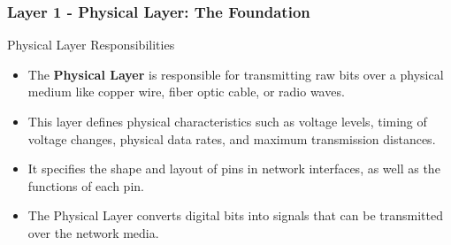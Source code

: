 \documentclass{beamer}
\begin{document}
\begin{frame}
    \frametitle{Layer 1 - Physical Layer: The Foundation}
    
    \begin{block}{Physical Layer Responsibilities}
        \begin{itemize}
            \item The \textbf{Physical Layer} is responsible for transmitting raw bits over a physical medium like copper wire, fiber optic cable, or radio waves.
            
            \item This layer defines physical characteristics such as voltage levels, timing of voltage changes, physical data rates, and maximum transmission distances.
            
            \item It specifies the shape and layout of pins in network interfaces, as well as the functions of each pin.
            
            \item The Physical Layer converts digital bits into signals that can be transmitted over the network media.
        \end{itemize}
    \end{block}
\end{frame}
\end{document}
